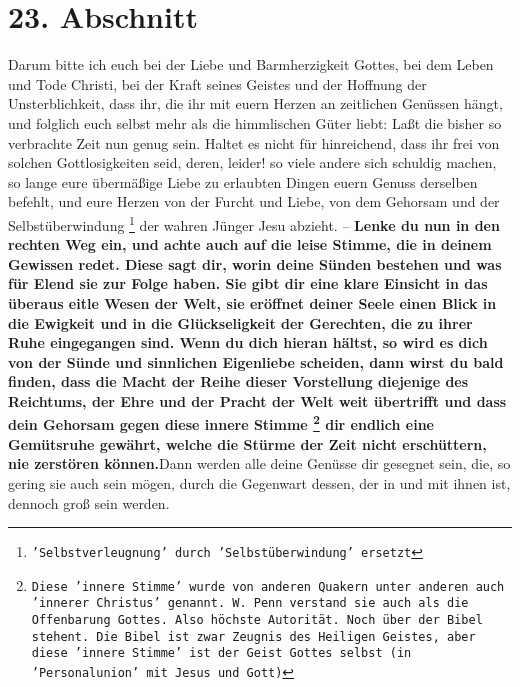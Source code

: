 \section{23. Abschnitt} \label{kap4_ab23}

\label{ref:04_23_innere_stimme}
Darum bitte ich euch bei der Liebe und Barmherzigkeit Gottes, bei dem Leben und
Tode Christi, bei der Kraft seines Geistes und der Hoffnung der Unsterblichkeit,
dass ihr, die ihr mit euern Herzen an zeitlichen Genüssen hängt, und folglich
euch selbst mehr als die himmlischen Güter liebt: Laßt die bisher so
verbrachte Zeit nun genug sein. Haltet es nicht für hinreichend, dass ihr frei
von solchen Gottlosigkeiten seid, deren, leider! so viele andere sich schuldig
machen, so lange eure übermäßige Liebe zu erlaubten Dingen euern Genuss derselben
befehlt, und eure Herzen von der Furcht und Liebe, von dem Gehorsam und der
Selbstüberwindung \footnote{\texttt{'Selbstverleugnung' durch 'Selbstüberwindung' ersetzt}} der wahren Jünger Jesu abzieht. -- \textbf{Lenke du nun in den
rechten Weg ein, und achte auch auf die leise Stimme, die in deinem Gewissen redet.
Diese sagt dir, worin deine Sünden bestehen und was für Elend sie zur Folge
haben. Sie gibt dir eine klare Einsicht in das überaus eitle Wesen der Welt,
sie eröffnet deiner Seele einen Blick in die Ewigkeit und in die Glückseligkeit
der Gerechten, die zu ihrer Ruhe eingegangen sind. Wenn du dich hieran hältst,
so wird es dich von der Sünde und sinnlichen Eigenliebe scheiden, dann wirst du
bald finden, dass die Macht der Reihe dieser Vorstellung diejenige des
Reichtums, der Ehre und der Pracht der Welt weit übertrifft und dass dein
Gehorsam gegen diese innere Stimme 
\footnote{\texttt{Diese 'innere Stimme' wurde von anderen Quakern unter anderen
auch 'innerer Christus' genannt. W. Penn verstand sie auch als die Offenbarung
Gottes. Also höchste Autorität. Noch über der Bibel stehent. Die Bibel
ist zwar Zeugnis des Heiligen Geistes, aber diese 'innere Stimme' ist
der Geist Gottes selbst (in 'Personalunion' mit Jesus und Gott)}}
dir endlich eine Gemütsruhe gewährt, welche
die Stürme der Zeit nicht erschüttern, nie zerstören können.}Dann werden alle
deine Genüsse dir gesegnet sein, die, so gering sie auch sein mögen, durch die
Gegenwart dessen, der in und mit ihnen ist, dennoch groß sein werden.
\label{ref:04_23_innere_stimme_ende}

\medskip

